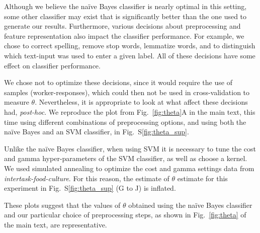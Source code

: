 \documentclass[12pt]{article}
\begin{document}
Although we believe the na\"ive Bayes classifier is nearly optimal in this
setting, some other classifier may exist that is significantly better than 
the one used to generate our results.  Furthermore, various decisions about
preprocessing and feature representation also
impact the classifier performance.  
For example, we chose to correct spelling, remove stop words,
lemmatize words, and to distinguish which text-input was used to enter a 
given label.  All of these decisions have some effect on classifier 
performance.

We chose not to optimize these decisions, since it would require the
use of samples (worker-responses), which could then not be used in 
cross-validation to measure $\theta$.  Nevertheless, it is
appropriate to look at what affect these decisions had, \textit{post-hoc}.  
We reproduce the plot from Fig.~\ref{fig:theta}A in the main text, 
this time using different combinations of preprocessing options,
and using both the na\"ive Bayes and an SVM classifier, in 
Fig.~S\ref{fig:theta_sup}.

Unlike the na\"ive Bayes classifier, when using SVM it is necessary to tune 
the cost and gamma hyper-parameters of the SVM classifier, as well as choose 
a kernel.  We used simulated annealing to optimize the cost and gamma settings
data from \textit{intertask-food-culture}.  For this reason, the estimate
of $\theta$ estimate for this experiment in 
Fig.~S\ref{fig:theta_sup} (G to J) is inflated. 

These plots suggest that the values of $\theta$ obtained using the 
na\"ive Bayes classifier and our particular choice of preprocessing steps, 
as shown in Fig.~\ref{fig:theta} of the main text, are representative.
\end{document}
